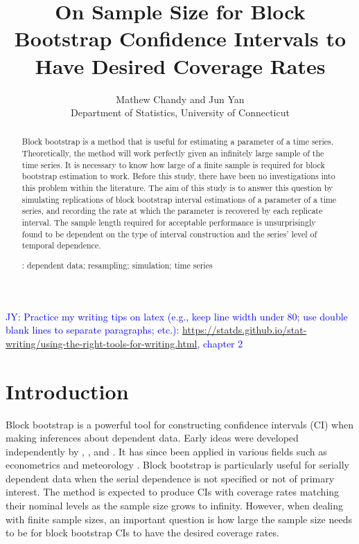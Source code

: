 \documentclass[12pt, letterpaper, titlepage]{article}
\title{On Sample Size for Block Bootstrap Confidence Intervals 
  to Have Desired Coverage Rates}
\author{Mathew Chandy
  and Jun Yan\\[1ex]
  Department of Statistics, University of Connecticut\\
}
\date{}
\newcommand{\jy}[1]{\textcolor{blue}{JY: #1}}
\begin{document}
 
\maketitle

\begin{abstract}
Block bootstrap is a method that is useful for estimating a parameter of a time
series. Theoretically, the method will work perfectly given an infinitely
large sample of the time series. It is necessary to know how large of a finite
sample is required for block bootstrap estimation to work. Before this study,
there have been no investigations into this problem within the literature. The
aim of this study is to answer this question by simulating replications of
block bootstrap interval estimations of a parameter of a time series, and
recording the rate at which the parameter is recovered by each replicate
interval. The sample length required for acceptable performance is
unsurprisingly found to be dependent on the type of interval construction and
the series' level of temporal dependence.


\bigskip
{}:
dependent data; resampling; simulation; time series
\end{abstract}

\doublespace

\jy{Practice my writing tips on latex (e.g., keep line width under 80; use
  double blank lines to separate paragraphs; etc.):
  \url{
https://statds.github.io/stat-writing/using-the-right-tools-for-writing.html},
  chapter 2}


\section{Introduction}
\label{sec:intro}

Block bootstrap is a powerful tool for constructing confidence intervals (CI)
when making inferences about dependent data. Early ideas were developed
independently by \citet{hall1985resampling}, \citet{carlstein1986use}, and 
\citet{kunsch1989jackknife}.
It has since been applied in various fields such as econometrics
\citep{mackinnon2006bootstrap} and meteorology \citep{varga2017generalised}.
Block bootstrap is particularly useful for serially dependent
data when the serial dependence is not specified or not of primary interest.
The method is expected to produce CIs with coverage rates
matching their nominal levels as the sample size grows to infinity. However,
when dealing with finite sample sizes, an important question is how large the
sample size needs to be for block bootstrap CIs to have the
desired coverage rates.
\end{document}
